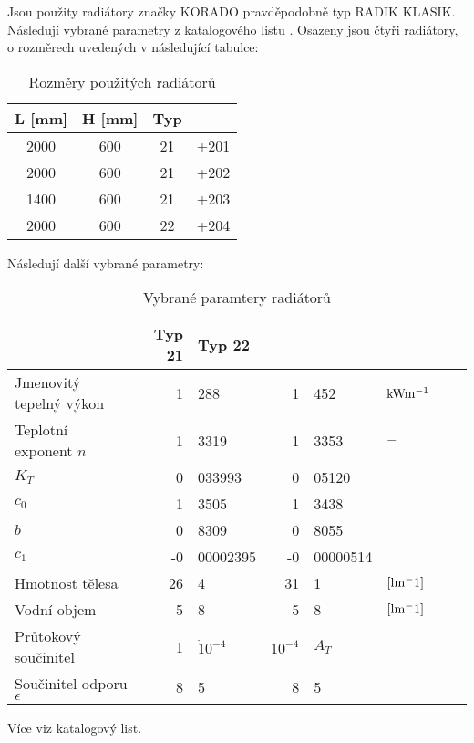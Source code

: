 \documentclass[a4paper,draft]{book}
\begin{document}
    Jsou použity radiátory značky KORADO pravděpodobně typ RADIK KLASIK.
    Následují vybrané parametry z katalogového listu \cite{radik}. Osazeny
    jsou čtyři radiátory, o rozměrech uvedených v následující tabulce:

    \begin{table}[hb]
      \centering
        \begin{tabular}{cccc}
          L [mm] & H [mm] & Typ \\
          \hline
          2000 & 600 & 21 & +201\\
          2000 & 600 & 21 & +202\\
          1400 & 600 & 21 & +203\\
          2000 & 600 & 22 & +204
        \end{tabular}
      \caption{Rozměry použitých radiátorů}
    \end{table}

    Následují další vybrané parametry:

    \begin{table}[h]
      \centering
        \begin{tabular}{l|r@{,}lr@{,}ll|lr}
          & Typ 21 & Typ 22\\
          \hline
          Jmenovitý tepelný výkon &  1&288    & 1&452   & $\rm kW m^{-1}$\\
          Teplotní exponent $n$   &  1&3319   & 1&3353  & $\rm -$\\
          $K_T$                   &  0&033993 & 0&05120 \\
          $c_0$                   &  1&3505   & 1&3438\\
          $b$                     &  0&8309   & 0&8055\\
          $c_1$                   & -0&00002395 & -0&00000514\\
          Hmotnost tělesa         &  26&4     & 31&1    & $\rm [l m^-1]$\\
          Vodní objem             &  5&8      & 5&8     & $\rm [l m^-1]$\\
          Průtokový součinitel    &  1&$\dot 10^{-4}$ & $10^{-4}$ & $A_T$\\
          Součinitel odporu $\epsilon$ & 8&5 & 8&5\\
        \end{tabular}
      \caption{Vybrané paramtery radiátorů}
    \end{table}

    Více viz katalogový list.
\end{document}
